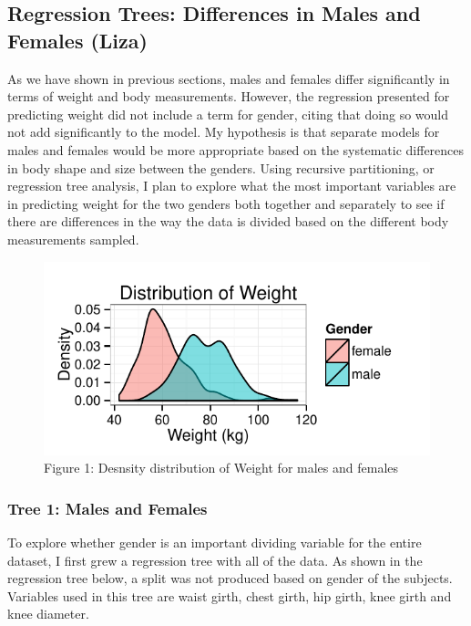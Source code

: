 \documentclass[11pt]{article}\usepackage[]{graphicx}\usepackage[]{color}
\makeatletter
\def\maxwidth{ %
  \ifdim\Gin@nat@width>\linewidth
    \linewidth
  \else
    \Gin@nat@width
  \fi
}
\newenvironment{knitrout}{}{} %
\makeatother
\begin{document}
\newpage

\subsection{Regression Trees: Differences in Males and Females (Liza)} %

As we have shown in previous sections, males and females differ significantly in terms of weight and body measurements. However, the regression presented for predicting weight did not include a term for gender, citing that doing so would not add significantly to the model. My hypothesis is that separate models for males and females would be more appropriate based on the systematic differences in body shape and size between the genders. Using recursive partitioning, or regression tree analysis, I plan to explore what the most important variables are in predicting weight for the two genders both together and separately to see if there are differences in the way the data is divided based on the different body measurements sampled.


\begin{center}
\begin{figure}[h]
\begin{knitrout}
\color{fgcolor}
\includegraphics[width=\maxwidth]{figure/wdt} 

\end{knitrout}

\vspace{-10pt}
\caption{Figure 1: Desnsity distribution of Weight for males and females}
\end{figure}
\end{center}

\subsubsection{Tree 1: Males and Females} 
To explore whether gender is an important dividing variable for the entire dataset, I first grew a regression tree with all of the data. As shown in the regression tree below, a split was not produced based on gender of the subjects. Variables used in this tree are waist girth, chest girth, hip girth, knee girth and knee diameter.
\end{document}
